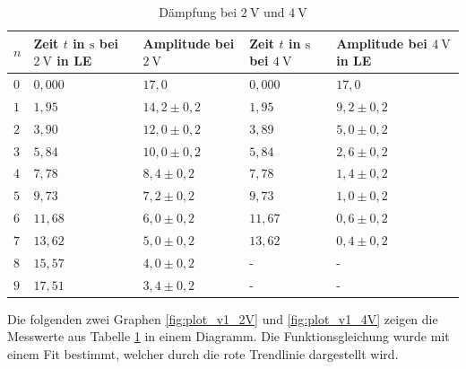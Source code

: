             \begin{table}[H]
                \centering
                \caption{Dämpfung bei $2\ \mathrm{V}$ und $4\ \mathrm{V}$}
                \vspace{0.5em}
                \begin{tabular}{|l|l|l||l|l|}
                    \hline
                    $n$ & Zeit $t$ in $\mathrm{s}$ bei $2\ \mathrm{V}$ in LE& Amplitude bei $2\ \mathrm{V}$ & Zeit $t$ in $\mathrm{s}$ bei $4\ \mathrm{V}$ & Amplitude bei $4\ \mathrm{V}$ in LE\\
                    \hline
                    \hline
                    $0$ & $0,000$ & $17,0$ & $0,000$ & $17,0$ \\
                    \hline
                    $1$ & $1,95$ & $14,2 \pm 0,2$ & $1,95$ & $9,2 \pm 0,2$ \\
                    \hline
                    $2$ & $3,90$ & $12,0 \pm 0,2$ & $3,89$ & $5,0 \pm 0,2$ \\
                    \hline
                    $3$ & $5,84$ & $10,0 \pm 0,2$ & $5,84$ & $2,6 \pm 0,2$ \\
                    \hline
                    $4$ & $7,78$ & $8,4 \pm 0,2$ & $7,78$ & $1,4 \pm 0,2$ \\
                    \hline
                    $5$ & $9,73$ & $7,2 \pm 0,2$ & $9,73$ & $1,0 \pm 0,2$ \\
                    \hline
                    $6$ & $11,68$ & $6,0 \pm 0,2$ & $11,67$ & $0,6 \pm 0,2$ \\
                    \hline
                    $7$ & $13,62$ & $5,0 \pm 0,2$ & $13,62$ & $0,4 \pm 0,2$ \\
                    \hline
                    $8$ & $15,57$ & $4,0 \pm 0,2$ & - & - \\
                    \hline
                    $9$ & $17,51$ & $3,4 \pm 0,2$ & - & - \\
                    \hline
                \end{tabular}
                \label{tab:ergebnisse_v1.2}
            \end{table}

            Die folgenden zwei Graphen \ref{fig:plot_v1_2V} und \ref{fig:plot_v1_4V} zeigen die Messwerte aus Tabelle \ref{tab:ergebnisse_v1.2} in einem Diagramm. Die Funktionsgleichung wurde mit einem Fit bestimmt, welcher durch die rote Trendlinie dargestellt wird.
            
